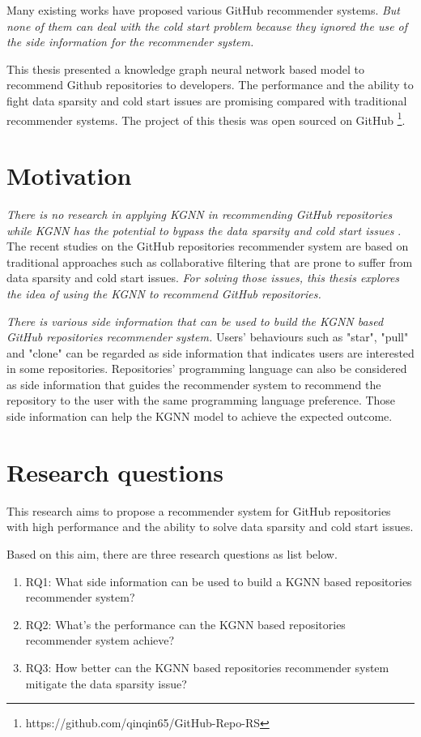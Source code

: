 \documentclass[11pt,twoside]{report}
\begin{document}
Many existing works have proposed various GitHub recommender systems. \textit{But none of them can deal with the cold start problem because they ignored the use of the side information for the recommender system.}

This thesis presented a knowledge graph neural network based model to recommend Github repositories to developers. The performance and the ability to fight data sparsity and cold start issues are promising compared with traditional recommender systems. The project of this thesis was open sourced on GitHub \footnote{https://github.com/qinqin65/GitHub-Repo-RS}.

\section{Motivation}
\textit{There is no research in applying KGNN in recommending GitHub repositories while KGNN has the potential to bypass the data sparsity and cold start issues} \cite{mansur_review_nodate}. The recent studies on the GitHub repositories recommender system are based on traditional approaches such as collaborative filtering that are prone to suffer from data sparsity and cold start issues. \textit{For solving those issues, this thesis explores the idea of using the KGNN to recommend GitHub repositories.}

\textit{There is various side information that can be used to build the KGNN based GitHub repositories recommender system.} Users’ behaviours such as "star", "pull" and "clone" can be regarded as side information that indicates users are interested in some repositories. Repositories' programming language can also be considered as side information that guides the recommender system to recommend the repository to the user with the same programming language preference. Those side information can help the KGNN model to achieve the expected outcome.

\section{Research questions}
This research aims to propose a recommender system for GitHub repositories with high performance and the ability to solve data sparsity and cold start issues.

Based on this aim, there are three research questions as list below.

\begin{enumerate}
    \item RQ1: What side information can be used to build a KGNN based repositories recommender system?
    \item RQ2: What’s the performance can the KGNN based repositories recommender system achieve?
    \item RQ3: How better can the KGNN based repositories recommender system mitigate the data sparsity issue?
\end{enumerate}
\end{document}
